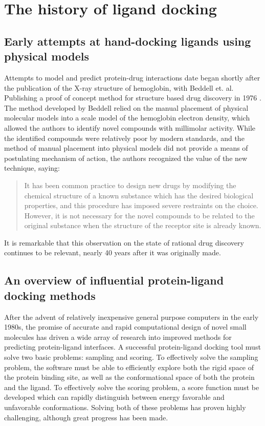 \section{The history of ligand docking}

\subsection{Early attempts at hand-docking ligands using physical models}
Attempts to model and predict protein-drug interactions date began shortly after the publication of the X-ray structure of hemoglobin, with Beddell et. al. Publishing a proof of concept method for structure based drug discovery in 1976 \citep{BEDDELL:1976go}.
The method developed by Beddell relied on the manual placement of physical molecular models into a scale model of the hemoglobin electron density, which allowed the authors to identify novel compounds with millimolar activity. 
While the identified compounds were relatively poor by modern standards, and the method of manual placement into physical models did not provide a means of postulating mechanism of action, the authors recognized the value of the new technique, saying:
\begin{quote}
It has been common practice to design new drugs by modifying the chemical structure of a known substance which has the desired biological properties, and this procedure has imposed severe restraints on the choice.
However, it is not necessary for the novel compounds to be related to the original substance when the structure of the receptor site is already known. 
\end{quote}
It is remarkable that this observation on the state of rational drug discovery continues to be relevant, nearly 40 years after it was originally made. 

\subsection{An overview of influential protein-ligand docking methods}
After the advent of relatively inexpensive general purpose computers in the early 1980s, the promise of accurate and rapid computational design of novel small molecules has driven a wide array of research into improved methods for predicting protein-ligand interfaces.
A successful protein-ligand docking tool must solve two basic problems: sampling and scoring.
To effectively solve the sampling problem, the software must be able to efficiently explore both the rigid space of the protein binding site, as well as the conformational space of both 	the protein and the ligand.
To effectively solve the scoring problem, a score function must be developed which can rapidly distinguish between energy favorable and unfavorable conformations.
Solving both of these problems has proven highly challenging, although great progress has been made. 

